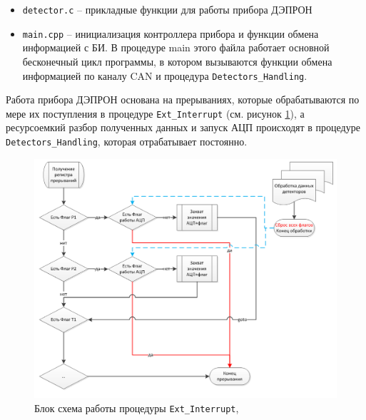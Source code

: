 \begin{itemize}
	\item 	\texttt{detector.c} -- прикладные функции для работы прибора ДЭПРОН
	
	
	\item \texttt{main.cpp} -- инициализация контроллера прибора и функции обмена информацией с БИ. В процедуре main этого файла работает основной бесконечный цикл программы, в котором вызываются функции обмена информацией по каналу CAN и процедура \texttt{Detectors\_Handling}.
	
	
\end{itemize}
Работа прибора ДЭПРОН основана на прерываниях, которые обрабатываются по мере их поступления в процедуре \texttt{Ext\_Interrupt} (см. рисунок \ref{fig:ext_interrupt}), а ресурсоемкий разбор полученных данных и запуск АЦП происходят в процедуре \texttt{Detectors\_Handling}, которая отрабатывает постоянно. 

\begin{figure}
\centering
\includegraphics[width=0.7\linewidth]{images/ext_interrupt}
\caption{Блок схема работы процедуры \texttt{Ext\_Interrupt}, }
\label{fig:ext_interrupt}
\end{figure}




